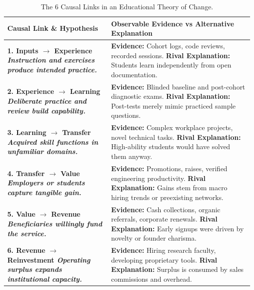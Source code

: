 \begin{table}[htbp]
\centering
\begin{tcolorbox}[
  enhanced,
  colback=white,
  colframe=BayesBorder!80!white,
  boxrule=0.4pt,
  arc=2pt,
  left=3pt,right=3pt,top=3pt,bottom=3pt,
  before skip=3pt,after skip=4pt
]
\scriptsize
\setlength{\tabcolsep}{3pt}
\renewcommand{\arraystretch}{1.18}
\begin{tabularx}{\linewidth}{@{} >{\bfseries\color{BayesInk}}p{2.3cm} >{\color{BayesInk}}X @{}}
\toprule
\textbf{Causal Link \& Hypothesis} & \textbf{Observable Evidence vs Alternative Explanation} \\
\midrule
1. Inputs $\rightarrow$ Experience\newline
\textit{Instruction and exercises produce intended practice.} & 
\textbf{Evidence:} Cohort logs, code reviews, recorded sessions.\newline
\textbf{Rival Explanation:} Students learn independently from open documentation. \\
\midrule
2. Experience $\rightarrow$ Learning\newline
\textit{Deliberate practice and review build capability.} & 
\textbf{Evidence:} Blinded baseline and post-cohort diagnostic exams.\newline
\textbf{Rival Explanation:} Post-tests merely mimic practiced sample questions. \\
\midrule
3. Learning $\rightarrow$ Transfer\newline
\textit{Acquired skill functions in unfamiliar domains.} & 
\textbf{Evidence:} Complex workplace projects, novel technical tasks.\newline
\textbf{Rival Explanation:} High-ability students would have solved them anyway. \\
\midrule
4. Transfer $\rightarrow$ Value\newline
\textit{Employers or students capture tangible gain.} & 
\textbf{Evidence:} Promotions, raises, verified engineering productivity.\newline
\textbf{Rival Explanation:} Gains stem from macro hiring trends or preexisting networks. \\
\midrule
5. Value $\rightarrow$ Revenue\newline
\textit{Beneficiaries willingly fund the service.} & 
\textbf{Evidence:} Cash collections, organic referrals, corporate renewals.\newline
\textbf{Rival Explanation:} Early signups were driven by novelty or founder charisma. \\
\midrule
6. Revenue $\rightarrow$ Reinvestment\newline
\textit{Operating surplus expands institutional capacity.} & 
\textbf{Evidence:} Hiring research faculty, developing proprietary tools.\newline
\textbf{Rival Explanation:} Surplus is consumed by sales commissions and overhead. \\
\bottomrule
\end{tabularx}
\end{tcolorbox}
\caption{The 6 Causal Links in an Educational Theory of Change.}
\label{tab:theory-of-change}
\end{table}

